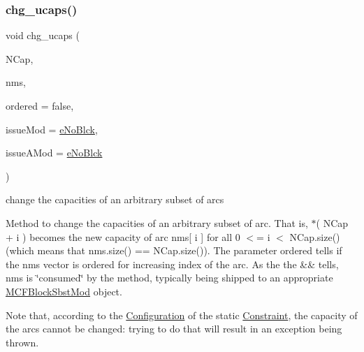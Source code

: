 \subsubsection{\texorpdfstring{chg\+\_\+ucaps()}{chg\_ucaps()}\hspace{0.1cm}{\footnotesize\ttfamily [2/2]}}
{\footnotesize\ttfamily void chg\+\_\+ucaps (\begin{DoxyParamCaption}\item[{\mbox{\hyperlink{class_s_m_spp__di__unipi__it_1_1_m_c_f_block_a2871db0555b42b11ad5315c7f631473b}{c\+\_\+\+Vec\+\_\+\+F\+Number\+\_\+it}}}]{N\+Cap,  }\item[{\mbox{\hyperlink{class_s_m_spp__di__unipi__it_1_1_m_c_f_block_a9a1284953e2aa5222b5867c0a7f98499}{Vec\+\_\+\+Index}} \&\&}]{nms,  }\item[{const bool}]{ordered = {\ttfamily false},  }\item[{\mbox{\hyperlink{group___modification___t_y_p_e_s_ga544246d8c462e9a2d817c2c30797968f}{c\+\_\+\+Mod\+Param}}}]{issue\+Mod = {\ttfamily \mbox{\hyperlink{group___modification___t_y_p_e_s_gga48fddcdd03a03f49b7e389ca1ed938d4ada69e89c5f46e563d8a13cfa6830c136}{e\+No\+Blck}}},  }\item[{\mbox{\hyperlink{group___modification___t_y_p_e_s_ga544246d8c462e9a2d817c2c30797968f}{c\+\_\+\+Mod\+Param}}}]{issue\+A\+Mod = {\ttfamily \mbox{\hyperlink{group___modification___t_y_p_e_s_gga48fddcdd03a03f49b7e389ca1ed938d4ada69e89c5f46e563d8a13cfa6830c136}{e\+No\+Blck}}} }\end{DoxyParamCaption})}



change the capacities of an arbitrary subset of arcs 

Method to change the capacities of an arbitrary subset of arc. That is, $\ast$( N\+Cap + i ) becomes the new capacity of arc nms\mbox{[} i \mbox{]} for all 0 $<$= i $<$ N\+Cap.\+size() (which means that nms.\+size() == N\+Cap.\+size()). The parameter ordered tells if the nms vector is ordered for increasing index of the arc. As the the \&\& tells, nms is \char`\"{}consumed\char`\"{} by the method, typically being shipped to an appropriate \mbox{\hyperlink{class_s_m_spp__di__unipi__it_1_1_m_c_f_block_sbst_mod}{M\+C\+F\+Block\+Sbst\+Mod}} object.

Note that, according to the \mbox{\hyperlink{class_s_m_spp__di__unipi__it_1_1_configuration}{Configuration}} of the static \mbox{\hyperlink{class_s_m_spp__di__unipi__it_1_1_constraint}{Constraint}}, the capacity of the arcs cannot be changed\+: trying to do that will result in an exception being thrown.

